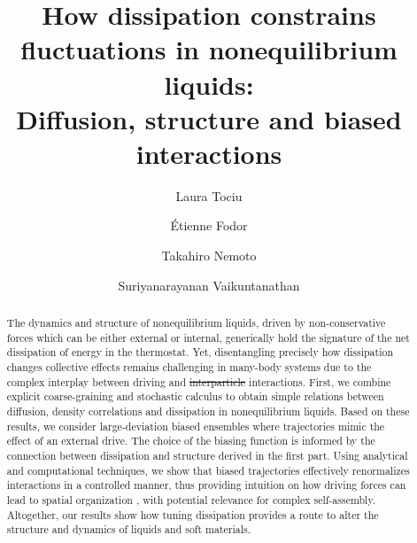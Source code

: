 \documentclass[superscriptaddress, twocolumn, prx, longbibliography, nofootinbib]{revtex4-1}
\providecommand{\DIFaddtex}[1]{{\protect\color{blue}\uwave{#1}}} %
\providecommand{\DIFdeltex}[1]{{\protect\color{red}\sout{#1}}}                      %
\providecommand{\DIFaddbegin}{} %
\providecommand{\DIFaddend}{} %
\providecommand{\DIFdelbegin}{} %
\providecommand{\DIFdelend}{} %
\providecommand{\DIFadd}[1]{\texorpdfstring{\DIFaddtex{#1}}{#1}} %
\providecommand{\DIFdel}[1]{\texorpdfstring{\DIFdeltex{#1}}{}} %
\begin{document}
\title{How dissipation constrains fluctuations in nonequilibrium liquids:\\Diffusion, structure and biased interactions}
\author{Laura Tociu}

\author{\'Etienne Fodor}

\author{Takahiro Nemoto}

\author{Suriyanarayanan Vaikuntanathan}

\begin{abstract}

The dynamics and structure of nonequilibrium liquids, driven by non-conservative forces which can be either external or internal, generically hold the signature of the net dissipation of energy in the thermostat. Yet, disentangling precisely how dissipation changes collective effects remains challenging in many-body systems due to the complex interplay between driving and \DIFdelbegin \DIFdel{interparticle }\DIFdelend \DIFaddbegin \DIFadd{particle }\DIFaddend interactions. First, we combine explicit coarse-graining and stochastic calculus to obtain simple relations between diffusion, density correlations and dissipation in nonequilibrium liquids. Based on these results, we consider large-deviation biased ensembles where trajectories mimic the effect of an external drive. The choice of the biasing function is informed by the connection between dissipation and structure derived in the first part. Using analytical and computational techniques, we show that biased trajectories effectively renormalizes interactions in a controlled manner, thus providing intuition on how driving forces can lead to spatial organization \DIFaddbegin \DIFadd{and collective dynamics}\DIFaddend , with potential relevance for complex self-assembly. Altogether, our results show how tuning dissipation provides a route to alter the structure and dynamics of liquids and soft materials.

\end{abstract}
\end{document}
